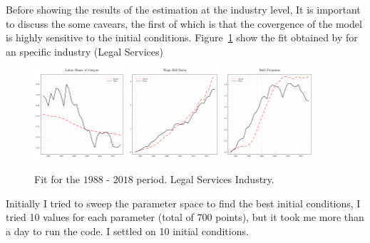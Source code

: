 \documentclass[12pt]{article}
\begin{document}
Before showing the results of the estimation at the industry level, It is important to discuss the some cavears, the first of which is that the covergence of the model is highly sensitive to the initial conditions. Figure~\ref{fig:estimation_5411} show the fit obtained by for an specific industry (Legal Services)
\begin{figure}[H]
    \centering
    \includegraphics[width=0.3\textwidth]{../images/fig_ind_5411_estimation_ls_doc.pdf}
        \hfill
    \includegraphics[width=0.3\textwidth]{../images/fig_ind_5411_estimation_wbr_doc.pdf}
    \hfill
    \includegraphics[width=0.3\textwidth]{../images/fig_ind_5411_estimation_sp_doc.pdf}
    \caption{\label{fig:estimation_5411} Fit for the $1988$ - $2018$ period. Legal Services Industry.}
\end{figure}

Initially I tried to sweep the parameter space to find the best initial conditions, I tried 10 values for each parameter (total of $700$ points), but it took me more than a day to run the code.
I settled on 10 initial conditions.
\end{document}
